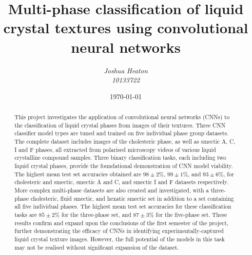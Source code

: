 \documentclass[12pt]{article}
\begin{document}
\title{Multi-phase classification of liquid crystal textures using convolutional neural networks}
\author{\textit{Joshua Heaton}\\\textit{10133722}}
\date{\today}

\maketitle

\begin{abstract}
This project investigates the application of convolutional neural networks (CNNs) to the classification of liquid crystal phases from images of their textures. Three CNN classifier model types are tuned and trained on five individual phase group datasets. The complete dataset includes images of the cholesteric phase, as well as smectic A, C, I and F phases, all extracted from polarised microscopy videos of various liquid crystalline compound samples. Three binary classification tasks, each including two liquid crystal phases, provide the foundational demonstration of CNN model viability. The highest mean test set accuracies obtained are $98\pm2\%$, $99\pm1\%$, and $93\pm6\%$, for cholesteric and smectic, smectic A and C, and smectic I and F datasets respectively. More complex multi-phase datasets are also created and investigated, with a three-phase cholesteric, fluid smectic, and hexatic smectic set in addition to a set containing all five individual phases. The highest mean test set accuracies for these classification tasks are $85\pm2\%$ for the three-phase set, and $87\pm3\%$ for the five-phase set. These results confirm and expand upon the conclusions of the first semester of the project, further demonstrating the efficacy of CNNs in identifying experimentally-captured liquid crystal texture images. However, the full potential of the models in this task may not be realised without significant expansion of the dataset.
\end{abstract}

\newpage
\tableofcontents

\newpage
{}
\end{document}

